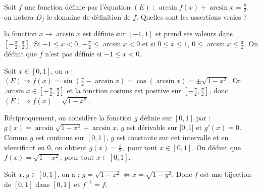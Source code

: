 \begin{question} 

Soit $f$ une fonction définie par l'équation $(E)$ : $ \arcsin f(x) + \arcsin x = \frac{\pi}{2}$. on notera $D_f$ le domaine de définition de $f$. Quelles sont les assertions vraies ?
\begin{answers}



\end{answers}
\begin{explanations}

\end{explanations}
la fonction $x \to \arcsin x$ est définie sur $[-1,1]$ et prend ses valeurs dans $[-\frac{\pi}{2}, \frac{\pi}{2}]$. Si $-1\le x <0$, $-\frac{\pi}{2}  \le  \arcsin x <0$ et si $0\le  x \le 1$, $0\le   \arcsin x \le  \frac{\pi}{2}$. On déduit que $f$ n'est pas définie si  $-1\le x <0$.

Soit $x \in [0,1]$, on a : $(E) \Rightarrow f(x)= \sin (\frac{\pi}{2} - \arcsin x) = \cos (\arcsin x) = \pm \sqrt{1-x^2} $. Or $\arcsin x \in [-\frac{\pi}{2}, \frac{\pi}{2}] $ et la fonction cosinus est positive sur $[-\frac{\pi}{2}, \frac{\pi}{2}] $, donc $(E) \Rightarrow f(x)= \sqrt{1-x^2}$. 

Réciproquement, on considère la fonction $g$ définie sur $[0,1]$ par : $g(x) =  \arcsin  \sqrt{1-x^2} + \arcsin x$. $g$ est dérivable sur $]0,1[$ et $g'(x)= 0$. Comme $g$ est continue sur $[0,1]$,  $g$ est constante sur cet intervalle et en identifiant en $0$, on obtient $g(x)= \frac{\pi}{2},$ pour tout $x \in [0,1]$. On déduit que $f(x) = \sqrt{1-x^2}$, pour tout $x \in [0,1]$. 

Soit $x, y \in [0,1]$, on a : $y=\sqrt{1-x^2} \Leftrightarrow x = \sqrt{1-y^2}$. Donc $f$ est une bijection de $[0,1]$ dans $[0,1]$ et $f^{-1} = f$.
\end{question}





